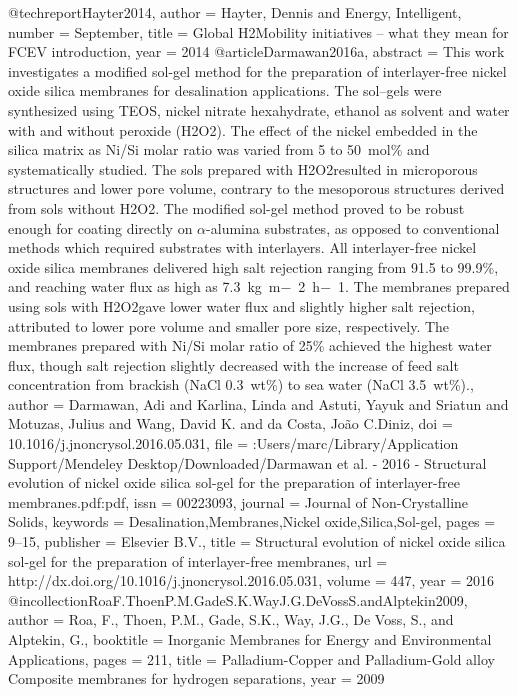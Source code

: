@techreport{Hayter2014,
author = {Hayter, Dennis and Energy, Intelligent},
number = {September},
title = {{Global H2Mobility initiatives – what they mean for FCEV introduction}},
year = {2014}
}
@article{Darmawan2016a,
abstract = {This work investigates a modified sol-gel method for the preparation of interlayer-free nickel oxide silica membranes for desalination applications. The sol–gels were synthesized using TEOS, nickel nitrate hexahydrate, ethanol as solvent and water with and without peroxide (H2O2). The effect of the nickel embedded in the silica matrix as Ni/Si molar ratio was varied from 5 to 50 mol{\%} and systematically studied. The sols prepared with H2O2resulted in microporous structures and lower pore volume, contrary to the mesoporous structures derived from sols without H2O2. The modified sol-gel method proved to be robust enough for coating directly on $\alpha$-alumina substrates, as opposed to conventional methods which required substrates with interlayers. All interlayer-free nickel oxide silica membranes delivered high salt rejection ranging from 91.5 to 99.9{\%}, and reaching water flux as high as 7.3 kg m− 2 h− 1. The membranes prepared using sols with H2O2gave lower water flux and slightly higher salt rejection, attributed to lower pore volume and smaller pore size, respectively. The membranes prepared with Ni/Si molar ratio of 25{\%} achieved the highest water flux, though salt rejection slightly decreased with the increase of feed salt concentration from brackish (NaCl 0.3 wt{\%}) to sea water (NaCl 3.5 wt{\%}).},
author = {Darmawan, Adi and Karlina, Linda and Astuti, Yayuk and Sriatun and Motuzas, Julius and Wang, David K. and da Costa, Jo{\~{a}}o C.Diniz},
doi = {10.1016/j.jnoncrysol.2016.05.031},
file = {:Users/marc/Library/Application Support/Mendeley Desktop/Downloaded/Darmawan et al. - 2016 - Structural evolution of nickel oxide silica sol-gel for the preparation of interlayer-free membranes.pdf:pdf},
issn = {00223093},
journal = {Journal of Non-Crystalline Solids},
keywords = {Desalination,Membranes,Nickel oxide,Silica,Sol-gel},
pages = {9--15},
publisher = {Elsevier B.V.},
title = {{Structural evolution of nickel oxide silica sol-gel for the preparation of interlayer-free membranes}},
url = {http://dx.doi.org/10.1016/j.jnoncrysol.2016.05.031},
volume = {447},
year = {2016}
}
@incollection{RoaF.ThoenP.M.GadeS.K.WayJ.G.DeVossS.andAlptekin2009,
author = {{Roa, F., Thoen, P.M., Gade, S.K., Way, J.G., De Voss, S., and Alptekin}, G.},
booktitle = {Inorganic Membranes for Energy and Environmental Applications},
pages = {211},
title = {{Palladium-Copper and Palladium-Gold alloy Composite membranes for hydrogen separations}},
year = {2009}
}

